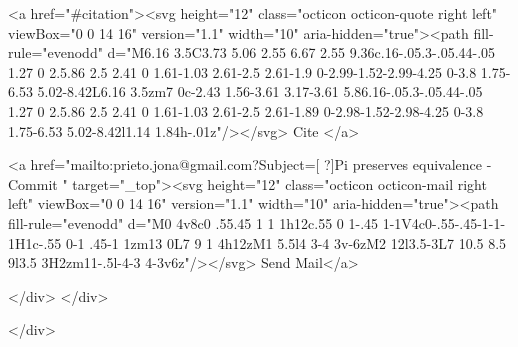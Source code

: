       <a  href="#citation"><svg height="12" class="octicon octicon-quote right left" viewBox="0 0 14 16" version="1.1" width="10" aria-hidden="true"><path fill-rule="evenodd" d="M6.16 3.5C3.73 5.06 2.55 6.67 2.55 9.36c.16-.05.3-.05.44-.05 1.27 0 2.5.86 2.5 2.41 0 1.61-1.03 2.61-2.5 2.61-1.9 0-2.99-1.52-2.99-4.25 0-3.8 1.75-6.53 5.02-8.42L6.16 3.5zm7 0c-2.43 1.56-3.61 3.17-3.61 5.86.16-.05.3-.05.44-.05 1.27 0 2.5.86 2.5 2.41 0 1.61-1.03 2.61-2.5 2.61-1.89 0-2.98-1.52-2.98-4.25 0-3.8 1.75-6.53 5.02-8.42l1.14 1.84h-.01z"/></svg> Cite
      </a>

      <a href="mailto:prieto.jona@gmail.com?Subject=[ ?]Pi preserves equivalence - Commit " target="_top"><svg height="12" class="octicon octicon-mail right left" viewBox="0 0 14 16" version="1.1" width="10" aria-hidden="true"><path fill-rule="evenodd" d="M0 4v8c0 .55.45 1 1 1h12c.55 0 1-.45 1-1V4c0-.55-.45-1-1-1H1c-.55 0-1 .45-1 1zm13 0L7 9 1 4h12zM1 5.5l4 3-4 3v-6zM2 12l3.5-3L7 10.5 8.5 9l3.5 3H2zm11-.5l-4-3 4-3v6z"/></svg> Send Mail</a>

    </div>
  </div>

</div>




